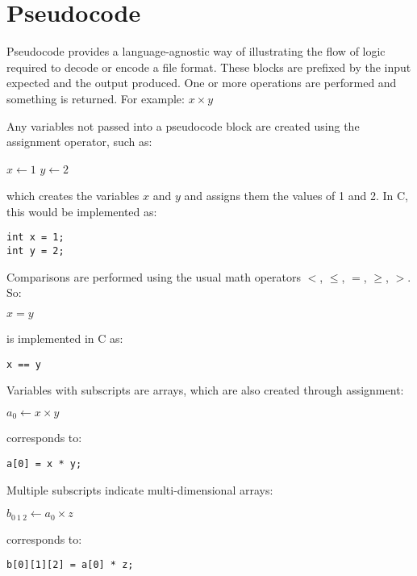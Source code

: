 \clearpage

\section{Pseudocode}

Pseudocode provides a language-agnostic way of illustrating the flow of logic
required to decode or encode a file format.
These blocks are prefixed by the input expected and the output produced.
One or more operations are performed and something is returned.
For example:
\Return $x \times y$\;
\EALGORITHM
\par
\noindent
Any variables not passed into a pseudocode block are created
using the assignment operator, such as:
\par
\noindent
\begin{algorithm}[H]
  \DontPrintSemicolon
  $x \leftarrow 1$\;
  $y \leftarrow 2$\;
\end{algorithm}
\par
\noindent
which creates the variables $x$ and $y$ and assigns them the values of 1 and 2.
In C, this would be implemented as:
\begin{Verbatim}[xleftmargin=.25in]
int x = 1;
int y = 2;
\end{Verbatim}
Comparisons are performed using the usual math operators
$<$, $\leq$, $=$, $\geq$, $>$.  So:
\par
\noindent
\begin{algorithm}[H]
  \DontPrintSemicolon
  $x = y$\;
\end{algorithm}
\par
\noindent
is implemented in C as:
\begin{Verbatim}[xleftmargin=.25in]
x == y
\end{Verbatim}
Variables with subscripts are arrays,
which are also created through assignment:
\par
\noindent
\begin{algorithm}[H]
  \DontPrintSemicolon
  $a_0 \leftarrow x \times y$\;
\end{algorithm}
\par
\noindent
corresponds to:
\begin{Verbatim}[xleftmargin=.25in]
a[0] = x * y;
\end{Verbatim}
Multiple subscripts indicate multi-dimensional arrays:
\par
\noindent
\begin{algorithm}[H]
  \DontPrintSemicolon
  $b_{0~1~2} \leftarrow a_0 \times z$\;
\end{algorithm}
\par
\noindent
corresponds to:
\begin{Verbatim}[xleftmargin=.25in]
b[0][1][2] = a[0] * z;
\end{Verbatim}

